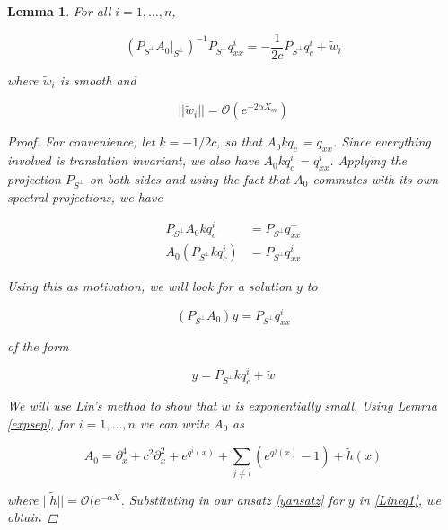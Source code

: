 \documentclass[12pt]{article}
\newtheorem{lemma}{Lemma}
\begin{document}
\begin{lemma}\label{Linsolve}
For all $i = 1, \dots, n$,
 
\begin{equation}
(P_{S^\perp} A_0|_{S^\perp})^{-1} P_{S^\perp} q^i_{xx} = -\frac{1}{2c}P_{S^\perp} q^i_c
+ \tilde{w}_i
\end{equation}

where $\tilde{w}_i$ is smooth and 

\begin{equation}
||\tilde{w}_i|| = \mathcal{O}(e^{-2 \alpha X_m})
\end{equation}

\begin{proof}
For convenience, let $k = -1/2c$, so that $A_0 k q_c$ = $q_{xx}$. Since everything involved is translation invariant, we also have $A_0 k q^i_c$ = $q^i_{xx}$. Applying the projection $P_{S^\perp}$ on both sides and using the fact that $A_0$ commutes with its own spectral projections, we have

\begin{align*}
P_{S^\perp} A_0 k q^i_c &= P_{S^\perp} q^-_{xx} \\
A_0 (P_{S^\perp} k q^i_c) &= P_{S^\perp} q^i_{xx}
\end{align*}

Using this as motivation, we will look for a solution $y$ to 

\begin{equation}\label{Lineq1}
(P_{S^\perp} A_0) y = P_{S^\perp} q^i_{xx}
\end{equation}

of the form

\begin{equation}\label{yansatz}
y = P_{S^\perp} k q^i_c + \tilde{w}
\end{equation}

We will use Lin's method to show that $\tilde{w}$ is exponentially small. Using Lemma \ref{expsep}, for $i = 1, \dots, n$ we can write $A_0$ as 

\begin{equation}\label{A0expansion}
A_0 = \partial_x^4 + c^2 \partial_x^2 + e^{q^i(x)} + \sum_{j \neq i} (e^{q^j(x)} - 1) + \tilde{h}(x)
\end{equation}

where $||\tilde{h}|| = \mathcal{O}(e^{-\alpha X}$. Substituting in our ansatz \eqref{yansatz} for $y$ in \eqref{Lineq1}, we obtain


\end{proof}
\end{lemma}
\end{document}

